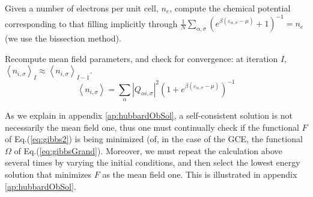 Given a number of electrons per unit cell, $n_e$, compute the chemical potential corresponding to that filling implicitly through $ \frac{1}{N} \sum_{\alpha, \sigma} (  e^{\beta ( \varepsilon_{\alpha, \sigma} - \mu ) } +1 )^{-1} = n_e$ (we use the bissection method).

Recompute mean field parameters, and check for convergence: at iteration $I$, $\left\langle n_{i,\sigma} \right\rangle_I \approx \left\langle n_{i,\sigma} \right\rangle_{I - 1}$.
\begin{equation}\label{eq:selfConsistent}
\left\langle n_{i,\sigma} \right\rangle = \sum_\alpha | Q_{\alpha i, \sigma} |^2 ( 1 + e^ { \beta ( \varepsilon_{\alpha, \sigma} - \mu )} )^{-1}
\end{equation}

As we explain in appendix \ref{ap:hubbardObSol}, a self-consistent solution is not necessarily the mean field one, thus one must continually check if the functional $F$ of Eq.(\ref{eq:gibbs2}) is being minimized (of, in the case of the \acs{GCE}, the functional $\Omega$ of Eq.(\ref{eq:gibbsGrand}).
Moreover, we must repeat the calculation above several times by varying the initial conditions, and then select the lowest energy solution that minimizes $F$ as the mean field one.
This is illustrated in appendix \ref{ap:hubbardObSol}.

